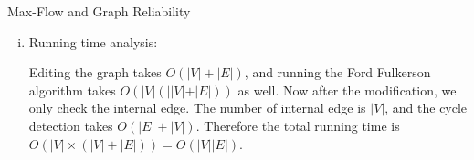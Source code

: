 \documentclass{article}
\numberwithin{table}{section}
\numberwithin{figure}{section}
\begin{document}
\begin{section}{Max-Flow and Graph Reliability}
\begin{enumerate}
\begin{tcolorbox}
\begin{enumerate}[(i)]
            Proof. If the internal edge of $v$ is disconnected, then there is no flow passing the external edge of $v$. It is the same as removing all the external edge of $v$.

            By definition $v$ is a separaing vertex if after removing all (external) edges connected to $v$, no $s-t$ path exists.

            By assuming the correctness of the algorithm in (a), then the smallest separating vertex set is the same as the same as the smallest separating internal edge set from the result of algorithm (a).

            \item Running time analysis:
            
            Editing the graph takes $O(|V|+|E|)$, and running the Ford Fulkerson algorithm takes $O(|V|(||V|+|E|))$ as well. 
            Now after the modification, we only check the internal edge. The number of internal edge is $|V|$, and the cycle detection takes $O(|E|+|V|)$. Therefore the total running time is $O(|V| \times (|V|+|E|)) = O(|V| |E|)$.
        \end{enumerate}
    \end{tcolorbox}
\end{enumerate}

\end{section}
\end{document}

